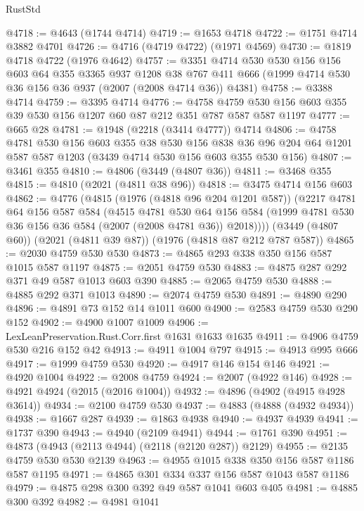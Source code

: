 \begin{lexlean}{RustStd}
\begin{coremodule}
{\begin{coremodule}
{{{{{{{{{{{{{{{{@4718 := @4643 (@1744 @4714)
@4719 := @1653 @4718
@4722 := @1751 @4714 @3882 @4701
@4726 := @4716 (@4719 @4722) (@1971 @4569)
@4730 := @1819 @4718 @4722 (@1976 @4642)
@4757 := @3351
    @4714
    @530
    @530
    @156
    @156
    @603
    @64
    @355
    @3365
    @937
    @1208
    @38
    @767
    @411
    @666
    (@1999 @4714 @530 @36 @156 @36 @937 (@2007 (@2008 @4714 @36)) @4381)
@4758 := @3388 @4714
@4759 := @3395 @4714
@4776 := @4758 @4759 @530 @156 @603 @355 @39 @530 @156 @1207 @60 @87 @212 @351 @787 @587 @587 @1197
@4777 := @665 @28
@4781 := @1948 (@2218 (@3414 @4777)) @4714
@4806 := @4758
    @4781
    @530
    @156
    @603
    @355
    @38
    @530
    @156
    @838
    @36
    @96
    @204
    @64
    @1201
    @587
    @587
    @1203
    (@3439 @4714 @530 @156 @603 @355 @530 @156)
@4807 := @3461 @355
@4810 := @4806 (@3449 (@4807 @36))
@4811 := @3468 @355
@4815 := @4810 (@2021 (@4811 @38 @96))
@4818 := @3475 @4714 @156 @603
@4862 := @4776
    (@4815
      (@1976 (@4818 @96 @204 @1201 @587))
      (@2217
        @4781
        @64
        @156
        @587
        @584
        (@4515
          @4781
          @530
          @64
          @156
          @584
          (@1999 @4781 @530 @36 @156 @36 @584 (@2007 (@2008 @4781 @36)) @2018))))
    (@3449 (@4807 @60))
    (@2021 (@4811 @39 @87))
    (@1976 (@4818 @87 @212 @787 @587))
@4865 := @2030 @4759 @530 @530
@4873 := @4865 @293 @338 @350 @156 @587 @1015 @587 @1197
@4875 := @2051 @4759 @530
@4883 := @4875 @287 @292 @371 @49 @587 @1013 @603 @390
@4885 := @2065 @4759 @530
@4888 := @4885 @292 @371 @1013
@4890 := @2074 @4759 @530
@4891 := @4890 @290
@4896 := @4891 @73 @152 @14 @1011 @600
@4900 := @2583 @4759 @530 @290 @152
@4902 := @4900 @1007 @1009
@4906 := LexLeanPreservation.Rust.Corr.first @1631 @1633 @1635
@4911 := @4906 @4759 @530 @216 @152 @42
@4913 := @4911 @1004 @797
@4915 := @4913 @995 @666
@4917 := @1999 @4759 @530
@4920 := @4917 @146 @154 @146
@4921 := @4920 @1004
@4922 := @2008 @4759
@4924 := @2007 (@4922 @146)
@4928 := @4921 @4924 (@2015 (@2016 @1004))
@4932 := @4896 (@4902 (@4915 @4928 @3614))
@4934 := @2100 @4759 @530
@4937 := @4883 (@4888 (@4932 @4934))
@4938 := @1667 @287
@4939 := @1863 @4938
@4940 := @4937 @4939
@4941 := @1737 @390
@4943 := @4940 (@2109 @4941)
@4944 := @1761 @390
@4951 := @4873 (@4943 (@2113 @4944) (@2118 (@2120 @287)) @2129)
@4955 := @2135 @4759 @530 @530 @2139
@4963 := @4955 @1015 @338 @350 @156 @587 @1186 @587 @1195
@4971 := @4865 @301 @334 @337 @156 @587 @1043 @587 @1186
@4979 := @4875 @298 @300 @392 @49 @587 @1041 @603 @405
@4981 := @4885 @300 @392
@4982 := @4981 @1041
}}}}}}}}}}}}}}}}
\end{coremodule}}
\end{coremodule}
\end{lexlean}
